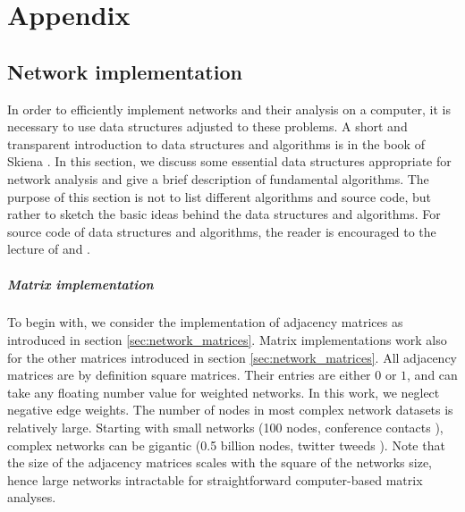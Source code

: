 \documentclass[openright,twoside,headsepline]{scrbook}
\begin{document}
\graphicspath{{/Users/lentz/Documents/GitHub_locals/Thesis/images/}}
\tableofcontents

\chapter{Appendix}

\section{Network implementation}\label{sec:implementation}
In order to efficiently implement networks and their analysis on a computer, it is necessary to use data structures adjusted to these problems.
A short and transparent introduction to data structures and algorithms is in the book of Skiena \citep{algorithm_design}.
In this section, we discuss some essential data structures appropriate for network analysis and give a brief description of fundamental algorithms.
The purpose of this section is not to list different algorithms and source code, but rather to sketch the basic ideas behind the data structures and algorithms.
For source code of data structures and algorithms, the reader is encouraged to the lecture of \citep{algorithm_design} and \citep{Merali:2010ih}.

\paragraph{Matrix implementation\color{Cayenne}{.}}
To begin with, we consider the implementation of adjacency matrices as introduced in section \ref{sec:network_matrices}.
Matrix implementations work also for the other matrices introduced in section \ref{sec:network_matrices}.
All adjacency matrices are by definition square matrices.
Their entries are either $0$ or $1$, and can take any floating number value for weighted networks.
In this work, we neglect negative edge weights.
The number of nodes in most complex network datasets is relatively large. 
Starting with small networks (100 nodes, conference contacts \citep{isella2011}), complex networks can be gigantic (0.5 billion nodes, twitter tweeds \citep{Yang:2011}).
Note that the size of the adjacency matrices scales with the square of the networks size, hence large networks intractable for straightforward computer-based matrix analyses.
\end{document}
